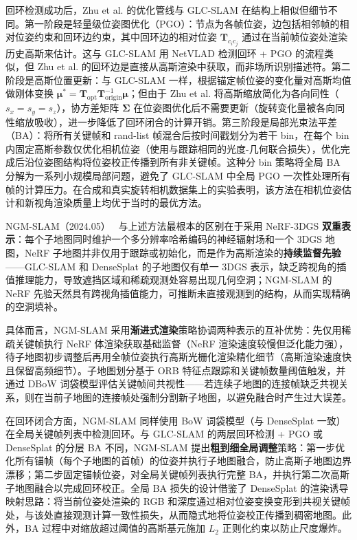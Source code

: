 回环检测成功后，Zhu et al. 的优化管线与 GLC-SLAM 在结构上相似但细节不同。第一阶段是轻量级位姿图优化（PGO）：节点为各帧位姿，边包括相邻帧的相对位姿约束和回环边约束，其中回环边的相对位姿 $\mathbf{T}_{c_i c_j}$ 通过在当前帧位姿处渲染历史高斯来估计。这与 GLC-SLAM 用 NetVLAD 检测回环 + PGO 的流程类似，但 Zhu et al. 的回环边是直接从高斯渲染中获取，而非场所识别描述符。第二阶段是高斯位置更新：与 GLC-SLAM 一样，根据锚定帧位姿的变化量对高斯均值做刚体变换 $\bm{\mu}^* = \mathbf{T}_{\mathrm{opt}} \mathbf{T}_{\mathrm{origin}}^{-1} \bm{\mu}$；但由于 Zhu et al. 将高斯缩放简化为各向同性（$s_x = s_y = s_z$），协方差矩阵 $\bm{\Sigma}$ 在位姿图优化后不需要更新（旋转变化量被各向同性缩放吸收），进一步降低了回环闭合的计算开销。第三阶段是局部光束法平差（BA）：将所有关键帧和 rand-list 帧混合后按时间戳划分为若干 bin，在每个 bin 内固定高斯参数仅优化相机位姿（使用与跟踪相同的光度-几何联合损失），优化完成后沿位姿图结构将位姿校正传播到所有非关键帧。这种分 bin 策略将全局 BA 分解为一系列小规模局部问题，避免了 GLC-SLAM 中全局 PGO 一次性处理所有帧的计算压力。在合成和真实旋转相机数据集上的实验表明，该方法在相机位姿估计和新视角渲染质量上均优于当时的最优方法。

NGM-SLAM（2024.05）~\cite{2405_19614} 与上述方法最根本的区别在于采用 NeRF-3DGS \textbf{双重表示}：每个子地图同时维护一个多分辨率哈希编码的神经辐射场和一个 3DGS 地图，NeRF 子地图并非仅用于跟踪或初始化，而是作为高斯渲染的\textbf{持续监督先验}——GLC-SLAM 和 DenseSplat 的子地图仅有单一 3DGS 表示，缺乏跨视角的插值推理能力，导致遮挡区域和稀疏观测处容易出现几何空洞；NGM-SLAM 的 NeRF 先验天然具有跨视角插值能力，可推断未直接观测到的结构，从而实现精确的空洞填补。

具体而言，NGM-SLAM 采用\textbf{渐进式渲染}策略协调两种表示的互补优势：先仅用稀疏关键帧执行 NeRF 体渲染获取基础监督（NeRF 渲染速度较慢但泛化能力强），待子地图初步调整后再用全帧位姿执行高斯光栅化渲染精化细节（高斯渲染速度快且保留高频细节）。子地图划分基于 ORB 特征点跟踪和关键帧数量阈值触发，并通过 DBoW 词袋模型评估关键帧间共视性——若连续子地图的连接帧缺乏共视关系，则在当前子地图的连接帧处强制分割新子地图，以避免融合时产生过大误差。

在回环闭合方面，NGM-SLAM 同样使用 BoW 词袋模型（与 DenseSplat 一致）在全局关键帧列表中检测回环。与 GLC-SLAM 的两层回环检测 + PGO 或 DenseSplat 的分层 BA 不同，NGM-SLAM 提出\textbf{粗到细全局调整}策略：第一步优化所有锚帧（每个子地图的首帧）的位姿并执行子地图融合，防止高斯子地图边界漂移；第二步固定锚帧位姿，对全局关键帧列表执行完整 BA，并执行第二次高斯子地图融合以完成回环校正。全局 BA 损失的设计借鉴了 DenseSplat 的渲染诱导映射思路：将当前位姿处渲染的 RGB 和深度通过相对位姿变换变形到共视关键帧处，与该处直接观测计算一致性损失，从而隐式地将位姿校正传播到稠密地图。此外，BA 过程中对缩放超过阈值的高斯基元施加 $L_2$ 正则化约束以防止尺度爆炸。

